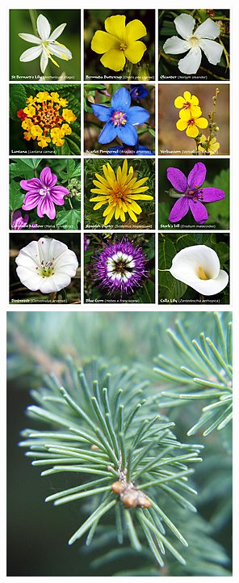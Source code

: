 \documentclass[11pt]{beamer}
\begin{document}
\begin{frame}
	\begin{columns}[T]
		\begin{figure}
			\centering
\includegraphics[height=0.35\textheight, width=\textwidth]{angiosperms.jpg}
\includegraphics[height=0.35\textheight, width=\textwidth]{gymnospermae.jpg}

\end{figure}
\end{columns}
\end{frame}
\end{document}
